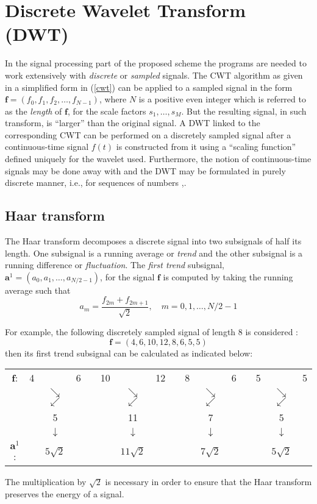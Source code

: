 \documentclass[a4paper,11pt]{report}
\begin{document}
\section{Discrete Wavelet Transform (DWT)}
In the signal processing part of the proposed scheme the programs are needed to work extensively with \emph{discrete} or \emph{sampled} signals. The CWT algorithm as given in a simplified form in (\ref{cwt}) can be applied to a sampled signal in the form $\mathbf{f} = (f_{0},f_{1},f_{2},\ldots,f_{N-1})$, where $N$ is a positive even integer which is referred to as the \emph{length} of $\mathbf{f}$, for the scale factors $s_{1},\ldots,s_{M}$. But the resulting signal, in such transform, is ``larger'' than the original signal. A DWT linked to the corresponding CWT can be performed on a discretely sampled signal after a continuous-time signal $f(t)$ is constructed from it using a ``scaling function'' defined uniquely for the wavelet used. Furthermore, the notion of continuous-time signals may be done away with and the DWT may be formulated in purely discrete manner, i.e., for sequences of numbers \cite{daub},\cite{stark}.

\subsection{Haar transform} \label{ht}
The Haar transform decomposes a discrete signal into two subsignals of half its length. One subsignal is a running average or \emph{trend} and the other subsignal is a running difference or \emph{fluctuation}. The \emph{first trend} subsignal, $\mathbf{a}^{1} = (a_{0},a_{1},\ldots,a_{N/2-1})$, for the signal $\mathbf{f}$ is computed by taking the running average such that 
\begin{equation} \label{am}
a_{m} = \frac{f_{2m}+f_{2m+1}}{\sqrt{2}}, \quad m=0,1,\ldots,N/2-1
\end{equation}

For example, the following discretely sampled signal of length 8 is considered \cite{walker}:
\begin{displaymath}
\mathbf{f} = (4,6,10,12,8,6,5,5)
\end{displaymath}
then its first trend subsignal can be calculated as indicated below:
\begin{center}
\begin{tabular}{cccccccccccccccc}
$\mathbf{f}$: & 4 & & 6 & & 10 & & 12 & & 8 & & 6 & & 5 & & 5 \\
 &   & $\searrow$$\swarrow$ & & & & $\searrow$$\swarrow$ & & & & $\searrow$$\swarrow$ & & & & $\searrow$$\swarrow$ &  \\
 &   & 5 & & & & 11 & & & & 7 & & & & 5 &   \\
 &   & $\downarrow$ & & & & $\downarrow$ & & & & $\downarrow$ & & & & $\downarrow$ &  \\
$\mathbf{a}^{1}$: & & $5\sqrt{2}$ & & & & $11\sqrt{2}$ & & & & $7\sqrt{2}$ & & & & $5\sqrt{2}$ &   
\end{tabular}
\end{center}
The multiplication by $\sqrt{2}$ is necessary in order to ensure that the Haar transform preserves the energy of a signal.
\end{document}

